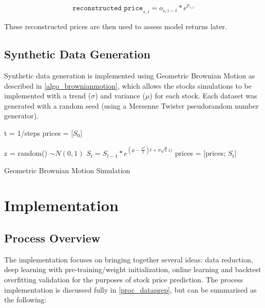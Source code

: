 \documentclass[a4paper,latin]{paper}
\begin{document}
\begin{equation}
\texttt{reconstructed price}_{s,i} = o_{s,i-t} * e^{p_{s,i}}
\end{equation}

These reconstructed prices are then used to assess model returns later.

\subsection{Synthetic Data Generation}\label{data_synthetic}

Synthetic data generation is implemented using Geometric Brownian Motion as described in \ref{algo_brownianmotion}, which allows the stocks simulations to be implemented with a trend ($\sigma$) and variance ($\mu$) for each stock. Each dataset was generated with a random seed (using a Mersenne Twister pseudorandom number generator). \newline

\begin{algorithm}[H]

	t = 1/steps\;
	prices = [$S_0$]\;

	{
		z = random()  $\sim N(0,1)$\;
		$S_t = S_{t-1}*e^{(\mu - \frac {\sigma^2}{2})t + \sigma  \sqrt{t}  z)}$\;
		prices = [prices; $S_t$]\;
	}
	\label{algo_brownianmotion}
	\caption{Geometric Brownian Motion Simulation}
\end{algorithm}




\newpage
\section{Implementation}\label{Implementation}
\subsection{Process Overview}\label{ProcessOverview}\label{imp_overview}


The implementation focuses on bringing together several ideas: data reduction, deep learning with pre-training/weight initialization, online learning and backtest overfitting validation for the purposes of stock price prediction. The process implementation is discussed fully in \ref{proc_dataprep}, but can be summarised as the following:
\end{document}

